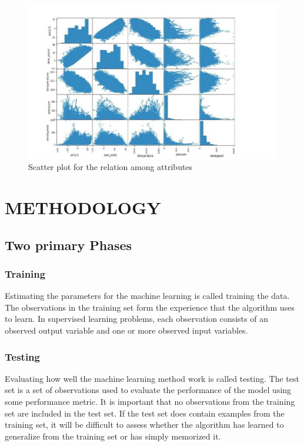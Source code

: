 \begin{figure}[h]
	\label{ss}    %
	\centering
	\includegraphics[width= 15 cm]{2.jpg}
	\caption{Scatter plot for the relation among attributes}
\end{figure}

\pagebreak
\chapter{METHODOLOGY}

\section{Two primary Phases }

\subsection{Training}

Estimating the parameters for the machine learning is called training the data. The observations in the training set form the experience that the algorithm uses to learn. In supervised learning problems, each observation consists of an observed output variable and one or more observed input variables.

\subsection{Testing}

Evaluating how well the machine learning method work is called testing. The test set is a set of observations used to evaluate the performance of the model using some performance metric. It is important that no observations from the training set are included in the test set. If the test 
set does contain examples from the training set, it will be difficult to assess whether the algorithm has learned to generalize from the training set or has simply memorized it.
\pagebreak
